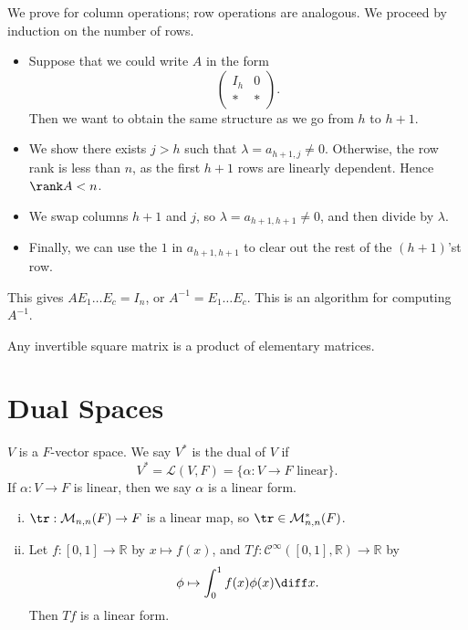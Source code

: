 \documentclass[12pt]{article}
\begin{document}
\begin{proofbox}
	We prove for column operations; row operations are analogous. We proceed by induction on the number of rows.
\begin{itemize}
	\item Suppose that we could write $A$ in the form
		\[
		\begin{pmatrix}
			I_h & 0 \\
			\ast & \ast
		\end{pmatrix}
		.\]
		Then we want to obtain the same structure as we go from $h$ to $h + 1$.
	\item We show there exists $j > h$ such that $\lambda = a_{h+1, j} \neq 0$. Otherwise, the row rank is less than $n$, as the first $h+1$ rows are linearly dependent. Hence $\rank A < n$.
	\item We swap columns $h + 1$ and $j$, so $\lambda = a_{h+1,h+1} \neq 0$, and then divide by $\lambda$.
	\item Finally, we can use the $1$ in $a_{h+1, h+1}$ to clear out the rest of the $(h+1)$'st row.
\end{itemize}
\end{proofbox}

This gives $A E_1 \ldots E_c = I_n$, or $A^{-1} = E_1 \ldots E_c$. This is an algorithm for computing $A^{-1}$.

\begin{proposition}
	Any invertible square matrix is a product of elementary matrices.
\end{proposition}

\newpage

\section{Dual Spaces}%
\label{sec:dual_spaces}

\begin{definition}
	$V$ is a $F$-vector space. We say $V^{\ast}$ is the dual of $V$ if
	\[
		V^{\ast} = \mathcal{L}(V, F) = \{ \alpha : V \to F \text{ linear}\}
	.\]
	If $\alpha : V \to F$ is linear, then we say $\alpha$ is a linear form.
\end{definition}

\begin{exbox}
	\begin{enumerate}[(i)]
		\item $\tr : \mathcal{M}_{n, n}(F) \to F$ is a linear map, so $\tr \in \mathcal{M}_{n,n}^{\ast}(F)$.
		\item Let $f : [0, 1] \to \mathbb{R}$ by $x \mapsto f(x)$, and $Tf : \mathcal{C}^{\infty}([0,1], \mathbb{R}) \to \mathbb{R}$ by
			\[
				\phi \mapsto \int_{0}^{1} f(x)\phi(x)\diff x
			.\]
			Then $Tf$ is a linear form.
	\end{enumerate}
\end{exbox}
\end{document}

